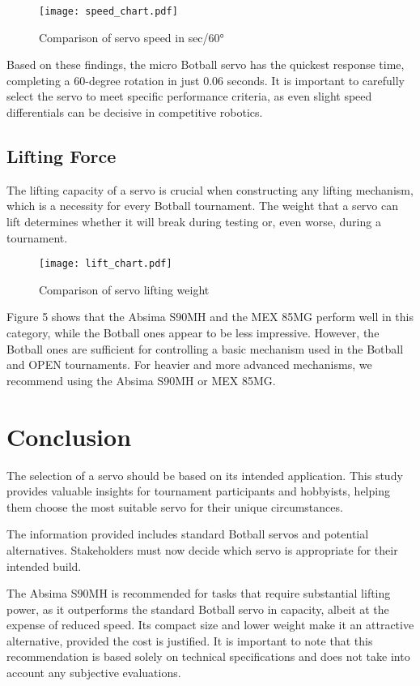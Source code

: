 \documentclass[conference]{IEEEtran}
\begin{document}
        \begin{figure}[htbp]
            \centering
            \texttt{[image: speed\_chart.pdf]}
            \caption{Comparison of servo speed in sec/60°}
        \end{figure}

        Based on these findings, the micro Botball servo has the quickest response time, completing a 60-degree rotation in just 0.06 seconds. It is important to carefully select the servo to meet specific performance criteria, as even slight speed differentials can be decisive in competitive robotics.

    \subsection{Lifting Force}
        The lifting capacity of a servo is crucial when constructing any lifting mechanism, which is a necessity for every Botball tournament. The weight that a servo can lift determines whether it will break during testing or, even worse, during a tournament.

        \begin{figure}[htbp]
            \centering
            \texttt{[image: lift\_chart.pdf]}
            \caption{Comparison of servo lifting weight}
        \end{figure}

        Figure 5 shows that the Absima S90MH and the MEX 85MG perform well in this category, while the Botball ones appear to be less impressive.   However, the Botball ones are sufficient for controlling a basic mechanism used in the Botball and OPEN tournaments. For heavier and more advanced mechanisms, we recommend using the Absima S90MH or MEX 85MG.

\section{Conclusion}
    The selection of a servo should be based on its intended application. This study provides valuable insights for tournament participants and hobbyists, helping them choose the most suitable servo for their unique circumstances.  
        
    The information provided includes standard Botball servos and potential alternatives. Stakeholders must now decide which servo is appropriate for their intended build.
        
    The Absima S90MH is recommended for tasks that require substantial lifting power, as it outperforms the standard Botball servo in capacity, albeit at the expense of reduced speed. Its compact size and lower weight make it an attractive alternative, provided the cost is justified. It is important to note that this recommendation is based solely on technical specifications and does not take into account any subjective evaluations.
        
\end{document}
